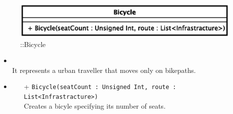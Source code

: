 \begin{figure}[h]
\centering
\includegraphics[scale=0.6,keepaspectratio]{images/solution/app/backend/bicycle.eps}
\caption{\pActive::Bicycle}
\label{fig:sd-app-bicycle}
\end{figure}
\FloatBarrier
\begin{itemize}
  \item \textbf{\descr} \\
It represents a urban traveller that moves only on bikepaths.
  \item \textbf{\ops}
  \begin{itemize}
  \item[+] \texttt{Bicycle(seatCount : Unsigned Int, route : List<Infrastracture>)} \\
Creates a bicyle specifying its number of seats.
  \end{itemize}
\end{itemize} 
